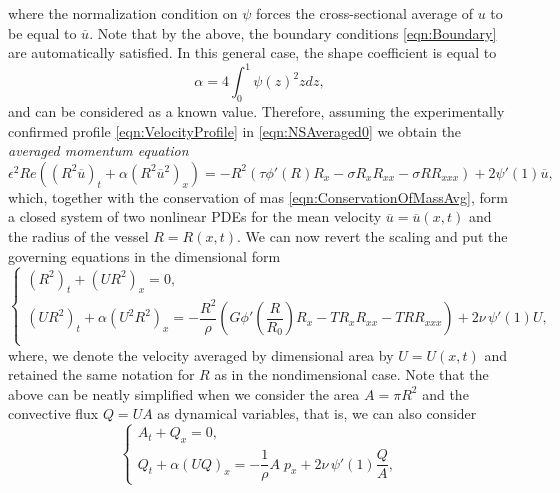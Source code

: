 \documentclass[12pt,a4paper]{article}
\begin{document}
where the normalization condition on $\psi$ forces the cross-sectional average of $u$ to be equal to $\overline{u}$. Note that by the above, the boundary conditions \eqref{eqn:Boundary} are automatically satisfied. In this general case, the shape coefficient is equal to
\begin{equation}
	\alpha = 4\int_0^1 \psi(z)^2 z dz,
\end{equation}
and can be considered as a known value. Therefore, assuming the experimentally confirmed profile \eqref{eqn:VelocityProfile} in \eqref{eqn:NSAveraged0} we obtain the \textit{averaged momentum equation}
\begin{equation}
	\epsilon^2 Re \left(\left(R^2 \overline{u}\right)_t + \alpha\left(R^2 \overline{u}^2\right)_x\right) = - R^2 \left(\tau \phi'(R) R_x - \sigma R_x R_{xx} - \sigma R R_{xxx}\right) + 2\psi'(1) \overline{u},
\end{equation}
which, together with the conservation of mas \eqref{eqn:ConservationOfMassAvg}, form a closed system of two nonlinear PDEs for the mean velocity $\overline{u}=\overline{u}(x,t)$ and the radius of the vessel $R=R(x,t)$. We can now revert the scaling and put the governing equations in the dimensional form
\begin{equation}\label{eqn:MainSystemDimensional}
	\begin{cases}
		(R^2)_t + (U R^2)_x = 0, \\
		\left(U R^2\right)_t + \alpha\left(U^2 R^2\right)_x = -\dfrac{R^2}{\rho} \left(G\phi'\left(\dfrac{R}{R_0}\right) R_x- T R_x R_{xx} - T R R_{xxx}\right) + 2\nu \,\psi'(1) U, \\
	\end{cases}
\end{equation}
where, we denote the velocity averaged by dimensional area by $U=U(x,t)$ and retained the same notation for $R$ as in the nondimensional case. Note that the above can be neatly simplified when we consider the area $A=\pi R^2$ and the convective flux $Q= U A$ as dynamical variables, that is, we can also consider
\begin{equation}\label{eqn:MainSystemDimensional}
	\begin{cases}
		A_t + Q_x = 0, \\
		Q_t + \alpha\left(U Q\right)_x = -\dfrac{1}{\rho}A \; p_x + 2\nu \,\psi'(1) \dfrac{Q}{A},
	\end{cases}
\end{equation}
\end{document}
